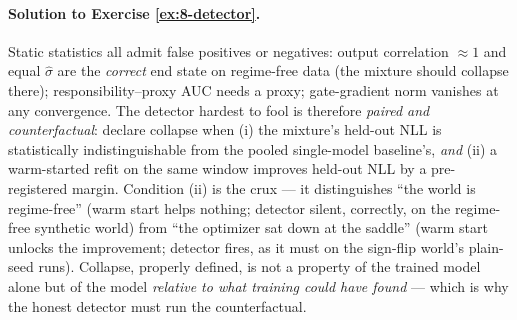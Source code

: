 \paragraph{Solution to Exercise \ref{ex:8-detector}.}
Static statistics all admit false positives or negatives: output
correlation $\approx 1$ and equal $\hat\sigma$ are the \emph{correct}
end state on regime-free data (the mixture should collapse there);
responsibility--proxy AUC needs a proxy; gate-gradient norm vanishes at
any convergence. The detector hardest to fool is therefore
\emph{paired and counterfactual}: declare collapse when (i) the
mixture's held-out NLL is statistically indistinguishable from the
pooled single-model baseline's, \emph{and} (ii) a warm-started refit on
the same window improves held-out NLL by a pre-registered margin.
Condition (ii) is the crux --- it distinguishes ``the world is
regime-free'' (warm start helps nothing; detector silent, correctly,
on the regime-free synthetic world) from ``the optimizer sat down at
the saddle'' (warm start unlocks the improvement; detector fires, as
it must on the sign-flip world's plain-seed runs). Collapse, properly
defined, is not a property of the trained model alone but of the model
\emph{relative to what training could have found} --- which is why the
honest detector must run the counterfactual.
